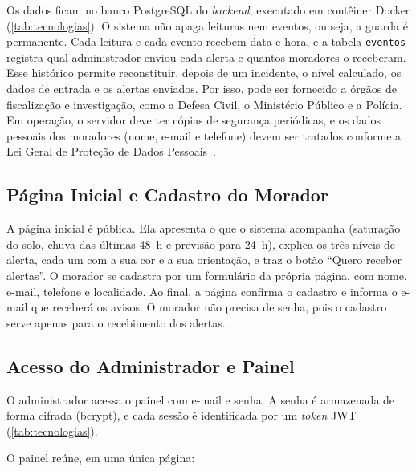 Os dados ficam no banco PostgreSQL do \textit{backend}, executado em
contêiner Docker (\autoref{tab:tecnologias}). O sistema não apaga leituras nem eventos, ou seja, a guarda é permanente. Cada leitura e cada evento
recebem data e hora, e a tabela \texttt{eventos} registra qual
administrador enviou cada alerta e quantos moradores o receberam.
Esse histórico permite reconstituir, depois de um incidente, o nível
calculado, os dados de entrada e os alertas enviados. Por isso, pode ser
fornecido a órgãos de fiscalização e investigação, como a Defesa Civil,
o Ministério Público e a Polícia. Em operação, o servidor deve ter cópias
de segurança periódicas, e os dados pessoais dos moradores (nome, e-mail
e telefone) devem ser tratados conforme a Lei Geral de Proteção de Dados
Pessoais~\cite{brasil2018lgpd}.

\subsection{Página Inicial e Cadastro do Morador}
\label{subsec:landing}

A página inicial é pública. Ela apresenta o que o sistema acompanha
(saturação do solo, chuva das últimas 48~h e previsão para 24~h),
explica os três níveis de alerta, cada um com a sua cor e a sua
orientação, e traz o botão ``Quero receber alertas''.
O morador se cadastra por um formulário da própria página, com nome,
e-mail, telefone e localidade. Ao final, a página confirma o cadastro e
informa o e-mail que receberá os avisos. O morador não precisa de senha, pois o cadastro serve apenas para o recebimento dos alertas.

\subsection{Acesso do Administrador e Painel}
\label{subsec:painel}

O administrador acessa o painel com e-mail e senha. A senha é armazenada
de forma cifrada (bcrypt), e cada sessão é identificada por um
\textit{token} JWT (\autoref{tab:tecnologias}).

O painel reúne, em uma única página:

